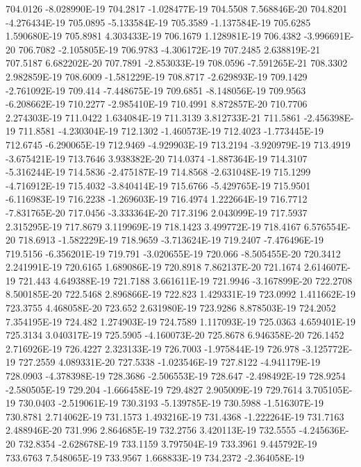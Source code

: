 704.0126  -8.028990E-19
704.2817  -1.028477E-19
704.5508  7.568846E-20
704.8201  -4.276434E-19
705.0895  -5.133584E-19
705.3589  -1.137584E-19
705.6285  1.590680E-19
705.8981  4.303433E-19
706.1679  1.128981E-19
706.4382  -3.996691E-20
706.7082  -2.105805E-19
706.9783  -4.306172E-19
707.2485  2.638819E-21
707.5187  6.682202E-20
707.7891  -2.853033E-19
708.0596  -7.591265E-21
708.3302  2.982859E-19
708.6009  -1.581229E-19
708.8717  -2.629893E-19
709.1429  -2.761092E-19
709.414  -7.448675E-19
709.6851  -8.148056E-19
709.9563  -6.208662E-19
710.2277  -2.985410E-19
710.4991  8.872857E-20
710.7706  2.274303E-19
711.0422  1.634084E-19
711.3139  3.812733E-21
711.5861  -2.456398E-19
711.8581  -4.230304E-19
712.1302  -1.460573E-19
712.4023  -1.773445E-19
712.6745  -6.290065E-19
712.9469  -4.929903E-19
713.2194  -3.920979E-19
713.4919  -3.675421E-19
713.7646  3.938382E-20
714.0374  -1.887364E-19
714.3107  -5.316244E-19
714.5836  -2.475187E-19
714.8568  -2.631048E-19
715.1299  -4.716912E-19
715.4032  -3.840414E-19
715.6766  -5.429765E-19
715.9501  -6.116983E-19
716.2238  -1.269603E-19
716.4974  1.222664E-19
716.7712  -7.831765E-20
717.0456  -3.333364E-20
717.3196  2.043099E-19
717.5937  2.315295E-19
717.8679  3.119969E-19
718.1423  3.499772E-19
718.4167  6.576554E-20
718.6913  -1.582229E-19
718.9659  -3.713624E-19
719.2407  -7.476496E-19
719.5156  -6.356201E-19
719.791  -3.020655E-19
720.066  -8.505455E-20
720.3412  2.241991E-19
720.6165  1.689086E-19
720.8918  7.862137E-20
721.1674  2.614607E-19
721.443  4.649388E-19
721.7188  3.661611E-19
721.9946  -3.167899E-20
722.2708  8.500185E-20
722.5468  2.896866E-19
722.823  1.429331E-19
723.0992  1.411662E-19
723.3755  4.468058E-20
723.652  2.631980E-19
723.9286  8.878503E-19
724.2052  7.354195E-19
724.482  1.274903E-19
724.7589  1.117093E-19
725.0363  4.659401E-19
725.3134  3.040317E-19
725.5905  -4.160073E-20
725.8678  6.946358E-20
726.1452  2.716926E-19
726.4227  2.323133E-19
726.7003  -1.975844E-19
726.978  -3.125772E-19
727.2559  4.089331E-20
727.5338  -1.023546E-19
727.8122  -4.941179E-19
728.0903  -4.378398E-19
728.3686  -2.506553E-19
728.647  -2.498492E-19
728.9254  -2.580505E-19
729.204  -1.666458E-19
729.4827  2.905009E-19
729.7614  3.705105E-19
730.0403  -2.519061E-19
730.3193  -5.139785E-19
730.5988  -1.516307E-19
730.8781  2.714062E-19
731.1573  1.493216E-19
731.4368  -1.222264E-19
731.7163  2.488946E-20
731.996  2.864685E-19
732.2756  3.420113E-19
732.5555  -4.245636E-20
732.8354  -2.628678E-19
733.1159  3.797504E-19
733.3961  9.445792E-19
733.6763  7.548065E-19
733.9567  1.668833E-19
734.2372  -2.364058E-19
